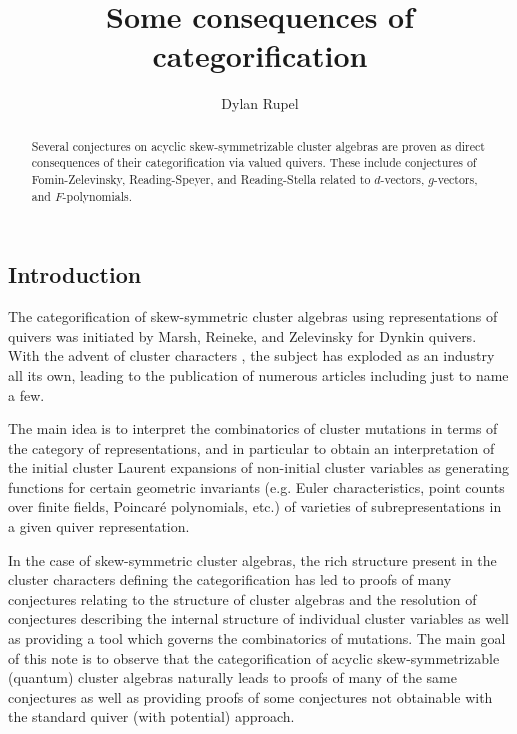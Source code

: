 \documentclass{amsart}
\title{Some consequences of categorification}
\author[Rupel]{Dylan Rupel}
\begin{document}
  \begin{abstract}
    Several conjectures on acyclic skew-symmetrizable cluster algebras are proven as direct consequences of their categorification via valued quivers.  These include conjectures of Fomin-Zelevinsky, Reading-Speyer, and Reading-Stella related to $d$-vectors, $g$-vectors, and $F$-polynomials.
  \end{abstract}
  \maketitle

  \subsection{Introduction}
  The categorification of skew-symmetric cluster algebras using representations of quivers was initiated by Marsh, Reineke, and Zelevinsky \cite{marsh-reineke-zelevinsky} for Dynkin quivers.  
  With the advent of cluster characters \cite{caldero-chapoton}, the subject has exploded as an industry all its own, leading to the publication of numerous articles including \cite{caldero-chapoton-schiffler,buan-marsh-reineke-reiten-todorov,derksen-weyman-zelevinsky,geiss-leclerc-schroer,caldero-keller,caldero-keller2,plamondon,palu,rupel1,qin,rupel2} just to name a few.  

  The main idea is to interpret the combinatorics of cluster mutations in terms of the category of representations, and in particular to obtain an interpretation of the initial cluster Laurent expansions of non-initial cluster variables as generating functions for certain geometric invariants (e.g. Euler characteristics, point counts over finite fields, Poincar\'e polynomials, etc.) of varieties of subrepresentations in a given quiver representation.
  
  In the case of skew-symmetric cluster algebras, the rich structure present in the cluster characters defining the categorification has led to proofs of many conjectures relating to the structure of cluster algebras \cite{cerulliirelli-keller-labardinifragoso-plamondon} and the resolution of conjectures describing the internal structure of individual cluster variables as well as providing a tool which governs the combinatorics of mutations.
  The main goal of this note is to observe that the categorification of acyclic skew-symmetrizable (quantum) cluster algebras \cite{rupel1,rupel2} naturally leads to proofs of many of the same conjectures as well as providing proofs of some conjectures not obtainable with the standard quiver (with potential) approach.  
\end{document}
